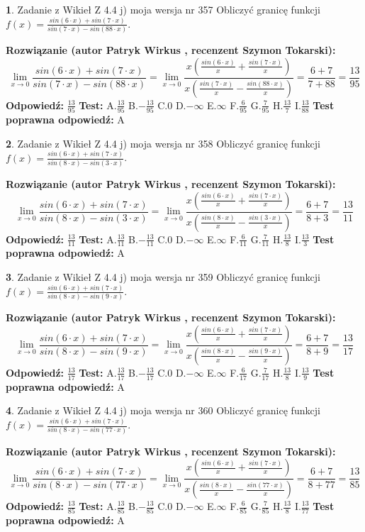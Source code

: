 \documentclass[12pt, a4paper]{article}
\theoremstyle{definition} %
\newtheorem{zad}{}
\newcommand{\zadStart}[1]{\begin{zad}#1\newline}
\newcommand{\zadStop}{\end{zad}}
\newcommand{\rozwStart}[2]{\noindent \textbf{Rozwiązanie (autor #1 , recenzent #2): }\newline}
\newcommand{\rozwStop}{\newline}
\newcommand{\odpStart}{\noindent \textbf{Odpowiedź:}\newline}
\newcommand{\odpStop}{\newline}
\newcommand{\testStart}{\noindent \textbf{Test:}\newline}
\newcommand{\testStop}{\newline}
\newcommand{\kluczStart}{\noindent \textbf{Test poprawna odpowiedź:}\newline}
\newcommand{\kluczStop}{\newline}
\begin{document}
\zadStart{Zadanie z Wikieł Z 4.4 j) moja wersja nr 357}
Obliczyć granicę funkcji $f(x)=\frac{sin(6\cdot x) +sin(7\cdot x)}{sin(7\cdot x) -sin(88\cdot x)}$.
\zadStop
\rozwStart{Patryk Wirkus}{Szymon Tokarski}
$$\lim\limits_{x\to 0}\frac{sin(6\cdot x) +sin(7\cdot x)}{sin(7\cdot x) -sin(88\cdot x)}=\lim\limits_{x\to 0}\frac{x(\frac{sin(6\cdot x)}{x}+\frac{sin(7\cdot x)}{x})}{x(\frac{sin(7\cdot x)}{x}-\frac{sin(88\cdot x)}{x})}=\frac{6+7}{7+88} = \frac{13}{95}$$
\rozwStop
\odpStart
$\frac{13}{95}$
\odpStop
\testStart
A.$\frac{13}{95}$
B.$-\frac{13}{95}$
C.$0$
D.$-\infty$
E.$\infty$
F.$\frac{6}{95}$
G.$\frac{7}{95}$
H.$\frac{13}{7}$
I.$\frac{13}{88}$
\testStop
\kluczStart
A
\kluczStop



\zadStart{Zadanie z Wikieł Z 4.4 j) moja wersja nr 358}
Obliczyć granicę funkcji $f(x)=\frac{sin(6\cdot x) +sin(7\cdot x)}{sin(8\cdot x) -sin(3\cdot x)}$.
\zadStop
\rozwStart{Patryk Wirkus}{Szymon Tokarski}
$$\lim\limits_{x\to 0}\frac{sin(6\cdot x) +sin(7\cdot x)}{sin(8\cdot x) -sin(3\cdot x)}=\lim\limits_{x\to 0}\frac{x(\frac{sin(6\cdot x)}{x}+\frac{sin(7\cdot x)}{x})}{x(\frac{sin(8\cdot x)}{x}-\frac{sin(3\cdot x)}{x})}=\frac{6+7}{8+3} = \frac{13}{11}$$
\rozwStop
\odpStart
$\frac{13}{11}$
\odpStop
\testStart
A.$\frac{13}{11}$
B.$-\frac{13}{11}$
C.$0$
D.$-\infty$
E.$\infty$
F.$\frac{6}{11}$
G.$\frac{7}{11}$
H.$\frac{13}{8}$
I.$\frac{13}{3}$
\testStop
\kluczStart
A
\kluczStop



\zadStart{Zadanie z Wikieł Z 4.4 j) moja wersja nr 359}
Obliczyć granicę funkcji $f(x)=\frac{sin(6\cdot x) +sin(7\cdot x)}{sin(8\cdot x) -sin(9\cdot x)}$.
\zadStop
\rozwStart{Patryk Wirkus}{Szymon Tokarski}
$$\lim\limits_{x\to 0}\frac{sin(6\cdot x) +sin(7\cdot x)}{sin(8\cdot x) -sin(9\cdot x)}=\lim\limits_{x\to 0}\frac{x(\frac{sin(6\cdot x)}{x}+\frac{sin(7\cdot x)}{x})}{x(\frac{sin(8\cdot x)}{x}-\frac{sin(9\cdot x)}{x})}=\frac{6+7}{8+9} = \frac{13}{17}$$
\rozwStop
\odpStart
$\frac{13}{17}$
\odpStop
\testStart
A.$\frac{13}{17}$
B.$-\frac{13}{17}$
C.$0$
D.$-\infty$
E.$\infty$
F.$\frac{6}{17}$
G.$\frac{7}{17}$
H.$\frac{13}{8}$
I.$\frac{13}{9}$
\testStop
\kluczStart
A
\kluczStop



\zadStart{Zadanie z Wikieł Z 4.4 j) moja wersja nr 360}
Obliczyć granicę funkcji $f(x)=\frac{sin(6\cdot x) +sin(7\cdot x)}{sin(8\cdot x) -sin(77\cdot x)}$.
\zadStop
\rozwStart{Patryk Wirkus}{Szymon Tokarski}
$$\lim\limits_{x\to 0}\frac{sin(6\cdot x) +sin(7\cdot x)}{sin(8\cdot x) -sin(77\cdot x)}=\lim\limits_{x\to 0}\frac{x(\frac{sin(6\cdot x)}{x}+\frac{sin(7\cdot x)}{x})}{x(\frac{sin(8\cdot x)}{x}-\frac{sin(77\cdot x)}{x})}=\frac{6+7}{8+77} = \frac{13}{85}$$
\rozwStop
\odpStart
$\frac{13}{85}$
\odpStop
\testStart
A.$\frac{13}{85}$
B.$-\frac{13}{85}$
C.$0$
D.$-\infty$
E.$\infty$
F.$\frac{6}{85}$
G.$\frac{7}{85}$
H.$\frac{13}{8}$
I.$\frac{13}{77}$
\testStop
\kluczStart
A
\kluczStop
\end{document}
